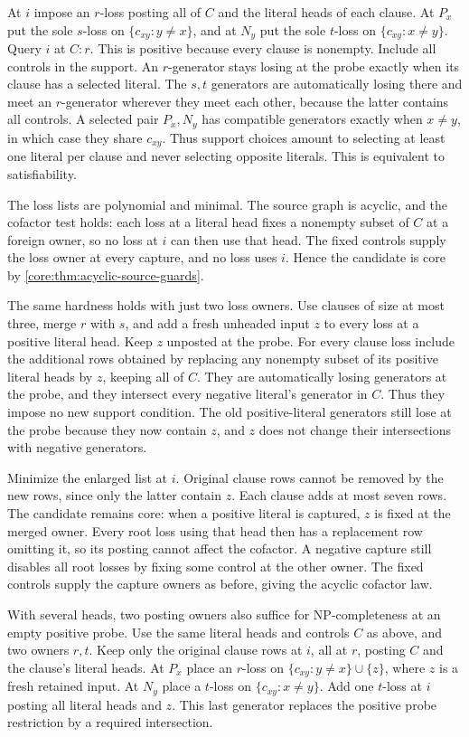 At $i$ impose an $r$-loss posting all of $C$ and the
literal heads of each clause. At $P_x$ put the sole $s$-loss
on $\{c_{xy}:y\ne x\}$, and at $N_y$ put the sole $t$-loss
on $\{c_{xy}:x\ne y\}$. Query $i$ at $C:r$.
This is positive because every clause is nonempty. Include
all controls in the support. An $r$-generator stays losing
at the probe exactly when its clause has a selected literal.
The $s,t$ generators are automatically losing there and
meet an $r$-generator wherever they meet each other, because
the latter contains all controls. A selected pair $P_x,N_y$
has compatible generators exactly when $x\ne y$, in which
case they share $c_{xy}$. Thus support choices amount to
selecting at least one literal per clause and never selecting
opposite literals. This is equivalent to satisfiability.

The loss lists are polynomial and minimal. The source graph
is acyclic, and the cofactor test holds: each loss at a literal
head fixes a nonempty subset of $C$ at a foreign owner, so
no loss at $i$ can then use that head. The fixed controls
supply the loss owner at every capture, and no loss uses $i$.
Hence the candidate is core by
\cref{core:thm:acyclic-source-guards}.

The same hardness holds with just two loss owners. Use
clauses of size at most three, merge $r$ with $s$, and add
a fresh unheaded input $z$ to every loss at a positive
literal head. Keep $z$ unposted at the probe. For every
clause loss include the additional rows obtained by
replacing any nonempty subset of its positive literal heads
by $z$, keeping all of $C$. They are automatically losing
generators at the probe, and they intersect every negative
literal's generator in $C$. Thus they impose no new
support condition. The old positive-literal generators
still lose at the probe because they now contain $z$,
and $z$ does not change their intersections with negative
generators.

Minimize the enlarged list at $i$. Original clause rows
cannot be removed by the new rows, since only the latter
contain $z$. Each clause adds at most seven rows.
The candidate remains core: when a
positive literal is captured, $z$ is fixed at the merged
owner. Every root loss using that head then has a replacement
row omitting it, so its posting cannot affect the cofactor.
A negative capture still disables all root losses by fixing
some control at the other owner. The fixed controls supply
the capture owners as before, giving the acyclic cofactor
law.

With several heads, two posting owners also suffice
for NP-completeness at an empty positive probe.
Use the same literal heads and controls $C$ as
above, and two owners $r,t$. Keep only the original
clause rows at $i$, all at $r$, posting $C$ and the
clause's literal heads. At $P_x$ place an $r$-loss
on $\{c_{xy}:y\ne x\}\cup\{z\}$, where $z$ is a
fresh retained input. At $N_y$ place a $t$-loss on
$\{c_{xy}:x\ne y\}$. Add one $t$-loss at $i$ posting
all literal heads and $z$. This last generator
replaces the positive probe restriction by a
required intersection.

